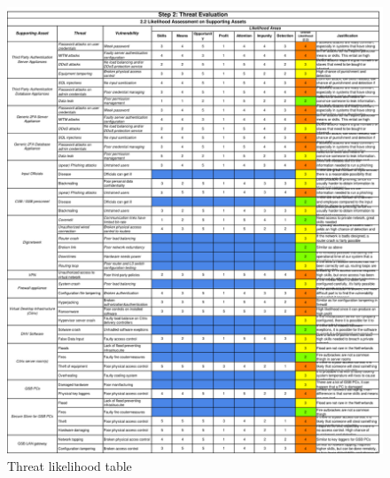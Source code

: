 \begin{figure}[]
    \centering
    \includegraphics[keepaspectratio,width=1\textwidth]{03-risk-analysis/003-TE/img/likelihood.pdf}
    \caption{Threat likelihood table}
    \label{fig:likelihood}
\end{figure}
